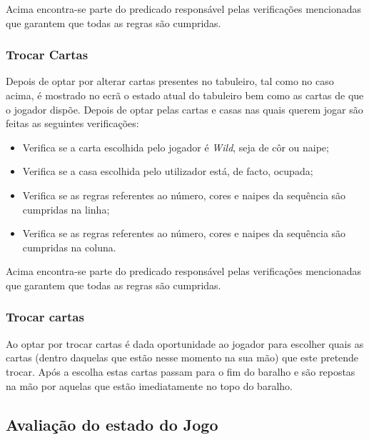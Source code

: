 \documentclass[a4paper]{article}
\begin{document}
	Acima encontra-se parte do predicado responsável pelas verificações mencionadas que garantem que todas as regras são cumpridas.

	\subsubsection{Trocar Cartas}

	Depois de optar por alterar cartas presentes no tabuleiro, tal como no caso acima, é mostrado no ecrã o estado atual do tabuleiro bem como as cartas de que o jogador dispõe. Depois de optar pelas cartas e casas nas quais querem jogar são feitas as seguintes verificações:

	\begin{itemize}
		\item Verifica se a carta escolhida pelo jogador é \textit{Wild}, seja de côr ou naipe;
		\item Verifica se a casa escolhida pelo utilizador está, de facto, ocupada;
		\item Verifica se as regras referentes ao número, cores e naipes da sequência são cumpridas na linha;
		\item Verifica se as regras referentes ao número, cores e naipes da sequência são cumpridas na coluna.
	\end{itemize}

	\lstset{  title=Código - 5}
	

	Acima encontra-se parte do predicado responsável pelas verificações mencionadas que garantem que todas as regras são cumpridas.

	\subsubsection{Trocar cartas}

	Ao optar por trocar cartas é dada oportunidade ao jogador para escolher quais as cartas (dentro daquelas que estão nesse momento na sua mão) que este pretende trocar. Após a escolha estas cartas passam para o fim do baralho e são repostas na mão por aquelas que estão imediatamente no topo do baralho.

	\lstset{  title=Código - 6}
	

	\subsection{Avaliação do estado do Jogo}
\end{document}
